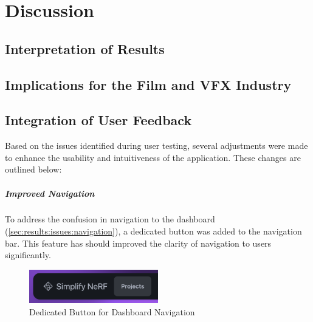 %
\chapter{Discussion}
\label{sec:discussion}



\section{Interpretation of Results}
\label{sec:discussion:results}

\section{Implications for the Film and VFX Industry}
\label{sec:discussion:implications}

\section{Integration of User Feedback}
\label{sec:discussion:user-feedback}

Based on the issues identified during user testing, several adjustments were made to enhance the usability and intuitiveness of the application. These changes are outlined below:

\paragraph{Improved Navigation}
To address the confusion in navigation to the dashboard (\ref{sec:results:issues:navigation}), a dedicated button was added to the navigation bar. 
This feature has should improved the clarity of  navigation to users significantly. 

\begin{figure}[htb]
  \centering
	\includegraphics[width=0.5\textwidth]{figures/fix-1.png}
	\caption{Dedicated Button for Dashboard Navigation}
  \label{fig:fix-1}
\end{figure}

